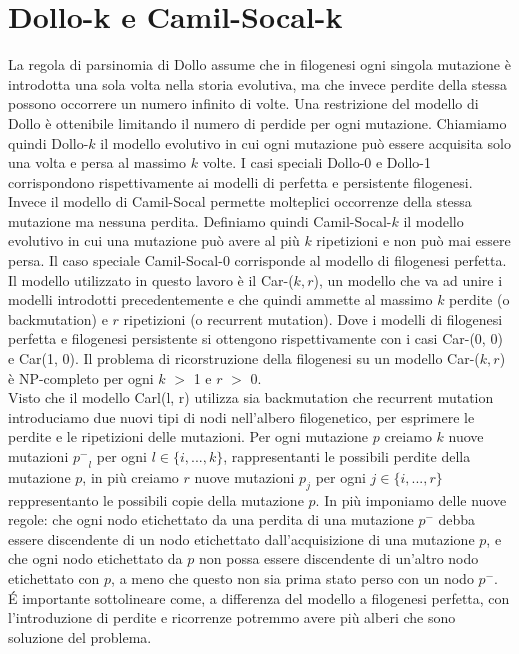 \documentclass{report}
\begin{document}
\section{Dollo-k e Camil-Socal-k}
  La regola di parsinomia di Dollo assume che in filogenesi ogni singola mutazione è introdotta una sola volta nella storia evolutiva, ma che invece perdite della stessa possono occorrere un numero infinito di volte. Una restrizione del modello di Dollo è ottenibile limitando il numero di perdide per ogni mutazione. Chiamiamo quindi Dollo-$k$ il modello evolutivo in cui ogni mutazione può essere acquisita solo una volta e persa al massimo $k$ volte. I casi speciali Dollo-0 e Dollo-1 corrispondono rispettivamente ai modelli di perfetta e persistente filogenesi.\\
  Invece il modello di Camil-Socal permette molteplici occorrenze della stessa mutazione ma nessuna perdita. Definiamo quindi Camil-Socal-$k$ il modello evolutivo in cui una mutazione può avere al più $k$ ripetizioni e non può mai essere persa. Il caso speciale Camil-Socal-0 corrisponde al modello di filogenesi perfetta.\\
  Il modello utilizzato in questo lavoro è il Car-($k, r$), un modello che va ad unire i modelli introdotti precedentemente e che quindi ammette al massimo $k$ perdite (o backmutation) e $r$ ripetizioni (o recurrent mutation). Dove i modelli di filogenesi perfetta e filogenesi persistente si ottengono rispettivamente con i casi Car-(0, 0) e Car(1, 0). Il problema di ricorstruzione della filogenesi su un modello Car-($k, r$) è NP-completo per ogni $k$ $>$ 1 e $r$ $>$ 0.\\
  Visto che il modello Carl(l, r) utilizza sia backmutation che recurrent mutation introduciamo due nuovi tipi di nodi nell'albero filogenetico, per esprimere le perdite e le ripetizioni delle mutazioni. Per ogni mutazione $p$ creiamo $k$ nuove mutazioni ${p^-}_{l}$ per ogni $l\in\{i, ..., k\}$, rappresentanti le possibili perdite della mutazione $p$, in più creiamo $r$ nuove mutazioni ${p}_{j}$ per ogni $j\in\{i, ..., r\}$ reppresentanto le possibili copie della mutazione $p$.
  In più imponiamo delle nuove regole: che ogni nodo etichettato da una perdita di una mutazione $p^-$ debba essere discendente di un nodo etichettato dall'acquisizione di una mutazione $p$, e che ogni nodo etichettato da $p$ non possa essere discendente di un'altro nodo etichettato con $p$, a meno che questo non sia prima stato perso con un nodo $p^-$.\\
  \'E importante sottolineare come, a differenza del modello a filogenesi perfetta, con l'introduzione di perdite e ricorrenze potremmo avere più alberi che sono soluzione del problema.
\end{document}
